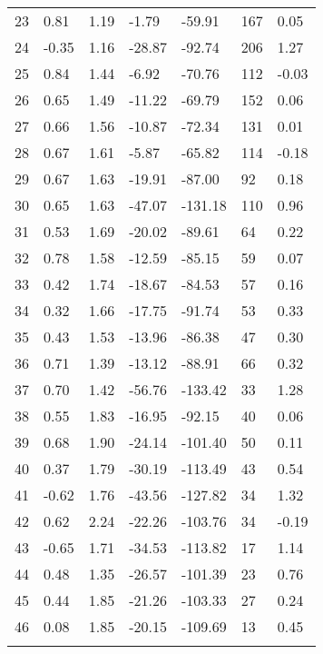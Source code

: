 \begin{appendices}
\begin{longtable}[c]{@{}lllllll@{}}
23 & 0.81 & 1.19 & -1.79 & -59.91 & 167 & 0.05 \\
24 & -0.35 & 1.16 & -28.87 & -92.74 & 206 & 1.27 \\
25 & 0.84 & 1.44 & -6.92 & -70.76 & 112 & -0.03 \\
26 & 0.65 & 1.49 & -11.22 & -69.79 & 152 & 0.06 \\
27 & 0.66 & 1.56 & -10.87 & -72.34 & 131 & 0.01 \\
28 & 0.67 & 1.61 & -5.87 & -65.82 & 114 & -0.18 \\
\rowcolor[HTML]{FFCCC9}
29 & 0.67 & 1.63 & -19.91 & -87.00 & 92 & 0.18 \\
30 & 0.65 & 1.63 & -47.07 & -131.18 & 110 & 0.96 \\
\rowcolor[HTML]{FFCCC9}
31 & 0.53 & 1.69 & -20.02 & -89.61 & 64 & 0.22 \\
\rowcolor[HTML]{FFCCC9}
32 & 0.78 & 1.58 & -12.59 & -85.15 & 59 & 0.07 \\
\rowcolor[HTML]{FFCCC9}
33 & 0.42 & 1.74 & -18.67 & -84.53 & 57 & 0.16 \\
\rowcolor[HTML]{FFCCC9}
34 & 0.32 & 1.66 & -17.75 & -91.74 & 53 & 0.33 \\
\rowcolor[HTML]{FFCCC9}
35 & 0.43 & 1.53 & -13.96 & -86.38 & 47 & 0.30 \\
\rowcolor[HTML]{FFCCC9}
36 & 0.71 & 1.39 & -13.12 & -88.91 & 66 & 0.32 \\
\rowcolor[HTML]{FFCCC9}
37 & 0.70 & 1.42 & -56.76 & -133.42 & 33 & 1.28 \\
\rowcolor[HTML]{FFCCC9}
38 & 0.55 & 1.83 & -16.95 & -92.15 & 40 & 0.06 \\
\rowcolor[HTML]{FFCCC9}
39 & 0.68 & 1.90 & -24.14 & -101.40 & 50 & 0.11 \\
\rowcolor[HTML]{FFCCC9}
40 & 0.37 & 1.79 & -30.19 & -113.49 & 43 & 0.54 \\
\rowcolor[HTML]{FFCCC9}
41 & -0.62 & 1.76 & -43.56 & -127.82 & 34 & 1.32 \\
\rowcolor[HTML]{FFCCC9}
42 & 0.62 & 2.24 & -22.26 & -103.76 & 34 & -0.19 \\
\rowcolor[HTML]{FFCCC9}
43 & -0.65 & 1.71 & -34.53 & -113.82 & 17 & 1.14 \\
\rowcolor[HTML]{FFCCC9}
44 & 0.48 & 1.35 & -26.57 & -101.39 & 23 & 0.76 \\
\rowcolor[HTML]{FFCCC9}
45 & 0.44 & 1.85 & -21.26 & -103.33 & 27 & 0.24 \\
\rowcolor[HTML]{FFCCC9}
46 & 0.08 & 1.85 & -20.15 & -109.69 & 13 & 0.45 \\
\rowcolor[HTML]{FFCCC9}

\end{longtable}
\end{appendices}
